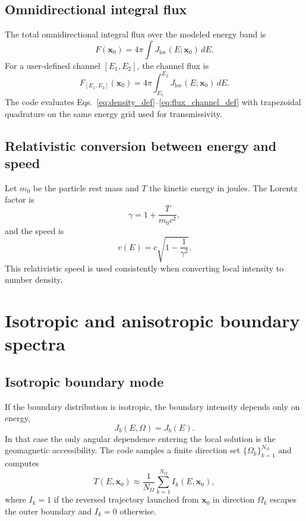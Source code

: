 \documentclass[11pt]{article}
\begin{document}
\subsection{Omnidirectional integral flux}
The total omnidirectional integral flux over the modeled energy band is
\begin{equation}
  F(\bm{x}_0)=4\pi\int J_{\mathrm{loc}}(E;\bm{x}_0)\,dE.
  \label{eq:flux_def}
\end{equation}
For a user-defined channel $[E_1,E_2]$, the channel flux is
\begin{equation}
  F_{[E_1,E_2]}(\bm{x}_0)=4\pi\int_{E_1}^{E_2} J_{\mathrm{loc}}(E;\bm{x}_0)\,dE.
  \label{eq:flux_channel_def}
\end{equation}
The code evaluates Eqs.~\eqref{eq:density_def}--\eqref{eq:flux_channel_def}
with trapezoidal quadrature on the same energy grid used for transmissivity.

\subsection{Relativistic conversion between energy and speed}
Let $m_0$ be the particle rest mass and $T$ the kinetic energy in joules. The
Lorentz factor is
\begin{equation}
  \gamma = 1 + \frac{T}{m_0 c^2},
\end{equation}
and the speed is
\begin{equation}
  v(E)=c\sqrt{1-\frac{1}{\gamma^2}}.
\end{equation}
This relativistic speed is used consistently when converting local intensity to
number density.

\section{Isotropic and anisotropic boundary spectra}
\subsection{Isotropic boundary mode}
If the boundary distribution is isotropic, the boundary intensity depends only on
energy,
\begin{equation}
  J_b(E,\Omega)=J_b(E).
\end{equation}
In that case the only angular dependence entering the local solution is the
geomagnetic accessibility. The code samples a finite direction set
$\{\Omega_k\}_{k=1}^{N_\Omega}$ and computes
\begin{equation}
  T(E,\bm{x}_0) \approx \frac{1}{N_\Omega}\sum_{k=1}^{N_\Omega} I_k(E,\bm{x}_0),
  \label{eq:T_iso_discrete}
\end{equation}
where $I_k=1$ if the reversed trajectory launched from $\bm{x}_0$ in direction
$\Omega_k$ escapes the outer boundary and $I_k=0$ otherwise.
\end{document}
